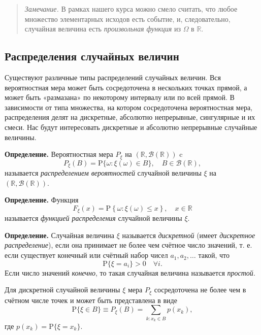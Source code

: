 \documentclass[11pt,a4paper]{article}
\begin{document}
\begin{quote}
\emph{Замечание.} В рамках нашего курса можно смело считать, что любое
множество элементарных исходов есть событие, и, следовательно, случайная
величина есть \emph{произвольная функция} из \(\Omega\) в
\(\mathbb{R}\).
\end{quote}

    \hypertarget{ux440ux430ux441ux43fux440ux435ux434ux435ux43bux435ux43dux438ux44f-ux441ux43bux443ux447ux430ux439ux43dux44bux445-ux432ux435ux43bux438ux447ux438ux43d}{%
\subsection{Распределения случайных
величин}\label{ux440ux430ux441ux43fux440ux435ux434ux435ux43bux435ux43dux438ux44f-ux441ux43bux443ux447ux430ux439ux43dux44bux445-ux432ux435ux43bux438ux447ux438ux43d}}

Существуют различные типы распределений случайных величин. Вся
вероятностная мера может быть сосредоточена в нескольких точках прямой,
а может быть «размазана» по некоторому интервалу или по всей прямой. В
зависимости от типа множества, на котором сосредоточена вероятностная
мера, распределения делят на дискретные, абсолютно непрерывные,
сингулярные и их смеси. Нас будут интересовать дискретные и абсолютно
непрерывные случайные величины.

\textbf{Определение.} Вероятностная мера \(P_\xi\) на
\((\mathbb{R}, \mathcal{B}(\mathbb{R}))\) c
\[ P_\xi(B) = \mathrm{P}\{\omega: \xi(\omega) \in B\}, \quad B \in \mathcal{B}(\mathbb{R}), \]
называется \emph{распределением вероятностей} случайной величины \(\xi\)
на \((\mathbb{R}, \mathcal{B}(\mathbb{R}))\).

\textbf{Определение.} Функция
\[ F_\xi(x) = \mathrm{P}\left\{ \omega: \xi(\omega) \le x \right\}, \quad x \in \mathbb{R} \]
называется \emph{функцией распределения} случайной величины \(\xi\).

\textbf{Определение.} Случайная величина \(\xi\) называется
\emph{дискретной} (имеет \emph{дискретное распределение}), если она
принимает не более чем счётное число значений, т. е. если существует
конечный или счётный набор чисел \(a_1, a_2, \ldots\) такой, что
\[ \mathrm{P}\{\xi=a_i\} > 0 \quad \forall i. \] Если число значений
\emph{конечно}, то такая случайная величина называется \emph{простой}.

Для дискретной случайной величины \(\xi\) мера \(P_\xi\) сосредоточена
не более чем в счётном числе точек и может быть представлена в виде
\[ \mathrm{P}\{\xi \in B\} \equiv P_\xi(B) = \sum\limits_{k:x_k \in B}p(x_k), \]
где \(p(x_k) = \mathrm{P}\{\xi=x_k\}\).
\end{document}
